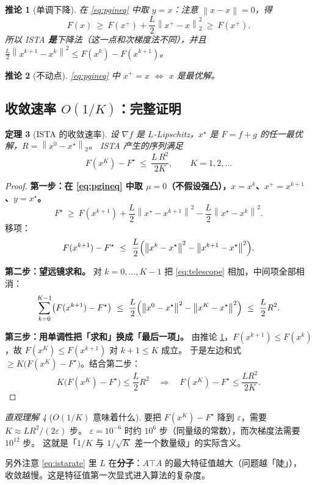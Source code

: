 \documentclass[11pt,a4paper,UTF8]{ctexart}
\theoremstyle{plain}
\newtheorem{theorem}{定理}[section]
\newtheorem{corollary}[theorem]{推论}
\theoremstyle{definition}
\theoremstyle{remark}
\newtheorem{intuition}[theorem]{直观理解}
\newcommand{\norm}[1]{\left\lVert #1 \right\rVert}
\newcommand{\eps}{\varepsilon}
\begin{document}
\begin{corollary}[单调下降]\label{cor:descent}
在 \eqref{eq:pgineq} 中取 $y=x$：注意 $\norm{x-x}=0$，得
\[
F(x)\ \ge\ F(x^+)+\frac L2\norm{x^+-x}_2^2\ \ge\ F(x^+).
\]
所以 ISTA \textbf{是}下降法（这一点和次梯度法不同），并且
$\frac L2\norm{x^{k+1}-x^k}^2\le F(x^k)-F(x^{k+1})$。
\end{corollary}

\begin{corollary}[不动点]
\eqref{eq:pgineq} 中 $x^+=x$ $\iff$ $x$ 是最优解。
\end{corollary}

\subsection{收敛速率 $O(1/K)$：完整证明}

\begin{theorem}[ISTA 的收敛速率]\label{thm:ista}
设 $\nabla f$ 是 $L$-Lipschitz，$x^\star$ 是 $F=f+g$ 的任一最优解，$R=\norm{x^0-x^\star}_2$。
ISTA 产生的序列满足
\begin{equation}
F(x^K)-F^\star\ \le\ \frac{L\,R^2}{2K},\qquad K=1,2,\dots
\label{eq:istarate}
\end{equation}
\end{theorem}

\begin{proof}
\textbf{第一步：在 \eqref{eq:pgineq} 中取 $\mu=0$（不假设强凸），$x=x^k$、$x^+=x^{k+1}$、$y=x^\star$。}
\[
F^\star\ \ge\ F(x^{k+1})+\frac L2\norm{x^\star-x^{k+1}}^2-\frac L2\norm{x^\star-x^k}^2 .
\]
移项：
\begin{equation}
F(x^{k+1})-F^\star\ \le\ \frac L2\Bigl(\norm{x^k-x^\star}^2-\norm{x^{k+1}-x^\star}^2\Bigr).
\label{eq:telescope}
\end{equation}

\textbf{第二步：望远镜求和。} 对 $k=0,\dots,K-1$ 把 \eqref{eq:telescope} 相加，中间项全部相消：
\[
\sum_{k=0}^{K-1}\bigl(F(x^{k+1})-F^\star\bigr)
\ \le\ \frac L2\Bigl(\norm{x^0-x^\star}^2-\norm{x^K-x^\star}^2\Bigr)
\ \le\ \frac L2R^2 .
\]

\textbf{第三步：用单调性把「求和」换成「最后一项」。}
由推论 \ref{cor:descent}，$F(x^{k+1})\le F(x^k)$，故 $F(x^K)\le F(x^{k+1})$ 对 $k+1\le K$ 成立。
于是左边和式 $\ge K\bigl(F(x^K)-F^\star\bigr)$。结合第二步：
\[
K\bigl(F(x^K)-F^\star\bigr)\le\frac L2R^2
\quad\Longrightarrow\quad
F(x^K)-F^\star\le\frac{LR^2}{2K}.
\]
\end{proof}

\begin{intuition}[$O(1/K)$ 意味着什么]
要把 $F(x^K)-F^\star$ 降到 $\eps$，需要 $K\approx LR^2/(2\eps)$ 步。
$\eps=10^{-6}$ 时约 $10^6$ 步（同量级的常数），而次梯度法需要 $10^{12}$ 步。
这就是「$1/K$ 与 $1/\sqrt K$ 差一个数量级」的实际含义。

另外注意 \eqref{eq:istarate} 里 $L$ 在\textbf{分子}：$A\top A$ 的最大特征值越大（问题越「陡」），
收敛越慢。这是特征值第一次显式进入算法的复杂度。
\end{intuition}
\end{document}
